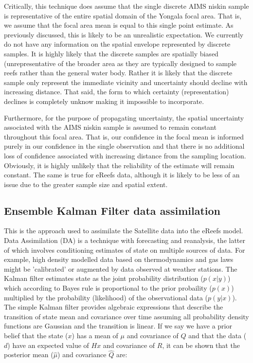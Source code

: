 Critically, this technique does assume that 
the single discrete AIMS niskin sample is representative of
the entire spatial domain of the Yongala focal area.  That is, we assume that the
focal area mean is equal to this single point estimate. 
As previously discussed, this is likely to be an unrealistic expectation.  We currently do not have any information
on the spatial envelope represented by discrete samples.
It is highly likely that the discrete samples are
spatially biased (unrepresentative of the broader area as they are typically designed to sample
reefs rather than the general water body.  Rather it is likely that the discrete sample only
represent the immediate vicinity and uncertainty should decline with increasing distance.  That
said, the form to which certainty (representation) declines is completely unknow making it
impossible to incorporate.

Furthermore, for the purpose of propagating uncertainty, the spatial uncertainty 
associated with the AIMS niskin sample is assumed to remain constant throughout this focal area.
That is, our confidence in the focal mean is informed purely in our confidence in the
single observation and that there is no additional loss of confidence associated with
increasing distance from the sampling location.
Obviously, it is highly unlikely that the reliability of the estimate will remain constant.
The same is true for eReefs data, although it is likely to be less of an issue due to the greater sample size and spatial extent.

\subsection{Ensemble Kalman Filter data assimilation}

This is the approach used to assimilate
the Satellite data into the eReefs model.
Data Assimilation (DA) is a technique with forecasting and reanalysis, the latter of
which involves conditioning estimates of state on multiple sources
of data.
For example, high density modelled data based on thermodynamics and gas laws might be
'calibrated' or augmented by data observed at weather stations.
The Kalman filter estimates state as the joint probability
distribution ($p(x|y)$) which according to Bayes rule is proportional to
the prior probaility ($p(x)$) multiplied by the probability (likelihood) of
the observational data ($p(y|x)$).
The simple Kalman filter provides algebraic expressions that
describe the transition of state mean and covariance over time
assuming all probability density functions are Gaussian and the
transition is linear.
If we say we have a prior belief that the state ($x$) has a mean of
$\mu$ and covariance of $Q$ and that the data ($d$) have an expected
value of $Hx$ and covariance of $R$, it can be shown that the posterior
mean ($\hat{\mu}$) and covariance $\hat{Q}$ are:\\

